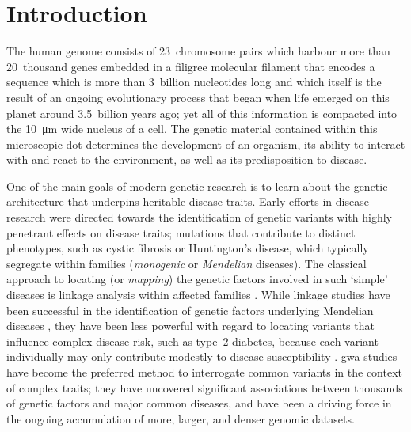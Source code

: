 
\glsresetall



{
\singlespacing
\chapter{Introduction}
\label{ch:introduction}
\minitoc
}


The human genome consists of 23~chromosome pairs which harbour more than 20~thousand genes embedded in a filigree molecular filament that encodes a sequence which is more than 3~billion nucleotides long and which itself is the result of an ongoing evolutionary process that began when life emerged on this planet around 3.5~billion years ago; yet all of this information is compacted into the \SI{10}{\micro\metre} wide nucleus of a cell.
The genetic material contained within this microscopic dot determines the development of an organism, its ability to interact with and react to the environment, as well as its predisposition to disease.

One of the main goals of modern genetic research is to learn about the genetic architecture that underpins heritable disease traits.
Early efforts in disease research were directed towards the identification of genetic variants with highly penetrant effects on disease traits; \eg mutations that contribute to distinct phenotypes, such as cystic fibrosis or Huntington’s disease, which typically segregate within families (\ie \emph{monogenic} or \emph{Mendelian} diseases).
The classical approach to locating (or \emph{mapping}) the genetic factors involved in such `simple' diseases is linkage analysis within affected families \citep[\eg, see][]{morris2007}.
While linkage studies have been successful in the identification of genetic factors underlying Mendelian diseases \citep{Altshuler:2008kp}, they have been less powerful with regard to locating variants that influence complex disease risk, such as type~2 diabetes, because each variant individually may only contribute modestly to disease susceptibility \citep{Risch:2000jb,Botstein:2003kf}.
\Gls{gwa} studies have become the preferred method to interrogate common variants in the context of complex traits; they have uncovered significant associations between thousands of genetic factors and major common diseases, and have been a driving force in the ongoing accumulation of more, larger, and denser genomic datasets.

